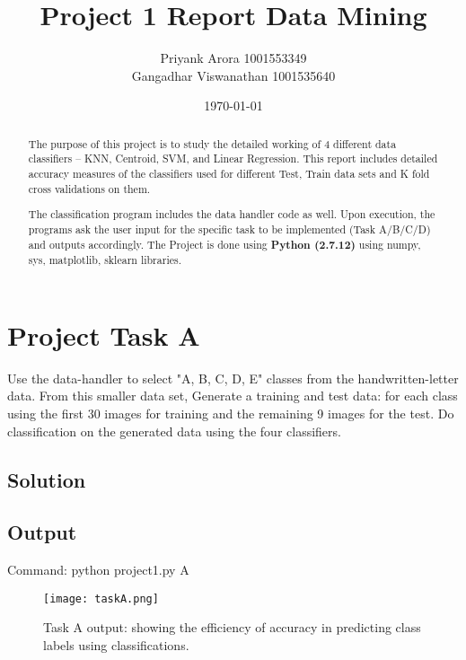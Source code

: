 \documentclass[a4paper]{article}
\title{Project 1 Report Data Mining}
\author{Priyank Arora 1001553349 \\ Gangadhar Viswanathan 1001535640}
\date{\today}
\begin{document}
\maketitle

\begin{abstract}
The purpose of this project is to study the detailed working of 4 different data classifiers – KNN, Centroid, SVM, and Linear Regression. This report includes detailed accuracy measures of the classifiers used for different Test, Train data sets and K fold cross validations on them. 

The classification program includes the data handler code as well. Upon  execution, the programs ask the user input for the specific task to be implemented (Task A/B/C/D) and outputs accordingly.
The Project is done using \textbf{Python (2.7.12)} using numpy, sys, matplotlib, sklearn libraries.
\end{abstract}

\section{Project Task A}
Use the data-handler to select "A, B, C, D, E" classes from the handwritten-letter data. From this smaller data set, Generate a training and test data: for each class
using the first 30 images for training and the remaining 9 images for the test.
Do classification on the generated data using the four classifiers.
\subsection{Solution}
\subsection{Output}
Command: python project1.py A
\begin{figure}
\centering
\texttt{[image: taskA.png]}
\caption{\label{fig:data} Task A output: showing the efficiency of accuracy in predicting class labels using classifications.}
\end{figure}
\FloatBarrier
\end{document}
